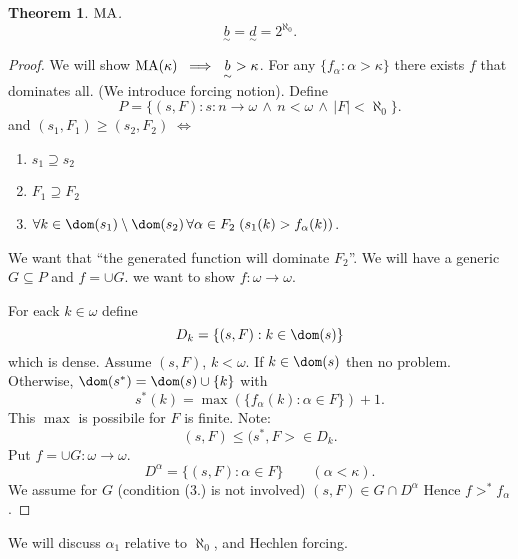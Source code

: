 \documentclass[11pt,pdftex,twoside,a4paper]{article}
\newcommand{\MA}{\ensuremath{\mathop{\rm MA}\nolimits}}
\newtheorem{thm}{Theorem}[section]
\theoremstyle{definition}
\begin{document}
\begin{thm}
\MA. 
\begin{equation*}
\underset{\sim}{b} = \underset{\sim}{d} = 2^{\aleph_0}.
\end{equation*}
\end{thm}
\begin{proof}
We will show \(\MA(\kappa)\;\implies\; \underset{\sim}{b}>\kappa\).
For any \(\{f_\alpha: \alpha>\kappa\}\) there exists $f$
that dominates all.
(We introduce forcing notion).
Define
\begin{equation*}
P = \{(s,F): s: n\to\omega\,\land\,n<\omega\,\land\,|F|<\aleph_0\}.
\end{equation*}
and \((s_1,F_1) \geq (s_2,F_2) \;\iff\)
\begin{enumerate}
\item \(s_1\supseteq s_2\)
\item \(F_1 \supseteq F_2\)
\item \(\forall k \in \dom(s_1)\setminus\dom(s_2)\,\forall \alpha\in F_2\;
  (s_1(k) > f_\alpha(k))\).
\end{enumerate}
We want that ``the generated function will dominate \(F_2\)''.
We will have a generic \(G\subseteq P\) and \(f=\cup G\).
we want to show \(f:\omega\to\omega\).

For eack \(k\in\omega\) define
\begin{equation*}
D_k = \{(s,F): k\in \dom(s)\}
\end{equation*}
which is dense.
Assume \((s,F)\), \(k<\omega\). If \(k\in\dom(s)\) then no problem.
Otherwise, \(\dom(s^*)= \dom(s) \cup\{k\}\) with
\begin{equation*}
s^*(k) = \max(\{f_\alpha(k): \alpha\in F\}) + 1.
\end{equation*}
This \(\max\) is possibile for $F$ is finite.
Note:
\begin{equation*}
(s,F) \leq (s^*,F> \in D_k.
\end{equation*}
Put \(f=\cup G: \omega\to\omega\).
\begin{equation*}
D^{\alpha} = \{(s,F): \alpha\in F\} \qquad (\alpha<\kappa).
\end{equation*}
We assume for $G$ (condition (3.) is not involved)
\((s,F) \in G \cap D^\alpha\)
Hence \(f >^* f_\alpha\).
\end{proof}

We will discuss \(\alpha_1\) relative to \(\aleph_0\),
and Hechlen forcing.

\end{document}
